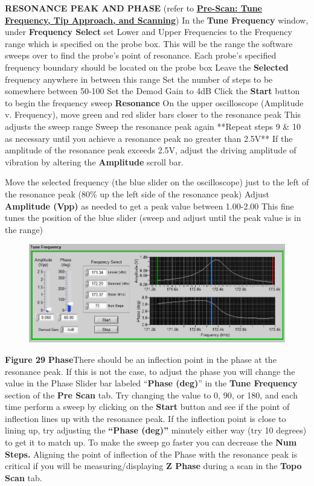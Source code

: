 \documentclass{../lab}
\begin{document}
\textbf{RESONANCE PEAK AND PHASE} (refer to \href{http://experimentationlab.berkeley.edu/sites/default/files/prescan\_final2.mp4}{\textbf{Pre-Scan: Tune Frequency, Tip Approach, and Scanning}})
In the \textbf{Tune Frequency }window, under \textbf{Frequency Select} set Lower and Upper Frequencies to the Frequency range which is specified on the probe box.  This will be the range the software sweeps over to find the probe's point of resonance.
Each probe’s specified frequency boundary should be located on the probe box
Leave the \textbf{Selected }frequency anywhere in between this range
Set the number of steps to be somewhere between 50-100
Set the Demod Gain to 4dB
Click the \textbf{Start} button to begin the frequency sweep
\textbf{Resonance}
\textbf{​}On the upper oscilloscope (Amplitude v. Frequency), move green and red slider bars closer to the resonance peak
This adjusts the sweep range
Sweep the resonance peak again
**Repeat steps 9 \& 10 as necessary until you achieve a resonance peak no greater than 2.5V**
If the amplitude of the resonance peak exceeds 2.5V, adjust the driving amplitude of vibration by altering the \textbf{Amplitude} scroll bar.

Move the selected frequency (the blue slider on the oscilloscope) just to the left of the resonance peak (80\% up the left side of the resonance peak)
Adjust \textbf{Amplitude (Vpp)} as needed to get a peak value between 1.00-2.00
This fine tunes the position of the blue slider
(sweep and adjust until the peak value is in the range)




\begin{figure}[h]
    \centering
    \href{http://dev-physicsadv.pantheon.berkeley.edu/sites/default/files/AFMImages/FreqPhase.JPG}{\includegraphics[width=0.5\linewidth]{images/FreqPhase.JPG}}
    \caption{}
    \label{fig:FreqPhase}
\end{figure}


\textbf{Figure 29}
\textbf{P}\textbf{hase}
\textbf{​}There should be an inflection point in the phase at the resonance peak.
If this is not the case, to adjust the phase you will change the value in the Phase Slider bar labeled ``\textbf{Phase (deg)}'' in the \textbf{Tune Frequency }section of the \textbf{Pre Scan }tab.  Try changing the value to 0, 90, or 180, and each time perform a sweep by clicking on the \textbf{Start }button and see if the point of inflection lines up with the resonance peak.  If the inflection point is close to lining up, try adjusting the \textbf{``Phase (deg)'' }minutely either way (try 10 degrees) to get it to match up.  To make the sweep go faster you can decrease the \textbf{Num Steps.  }
Aligning the point of inflection of the Phase with the resonance peak is critical if you will be measuring/displaying \textbf{Z Phase }during a scan in the \textbf{Topo }\textbf{Scan }tab.
\end{document}
